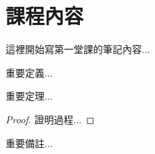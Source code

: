 
\section{課程內容}

這裡開始寫第一堂課的筆記內容...

\begin{definition}
重要定義...
\end{definition}

\begin{theorem}
重要定理...
\end{theorem}

\begin{proof}
證明過程...
\end{proof}

\begin{remark}
重要備註...
\end{remark}